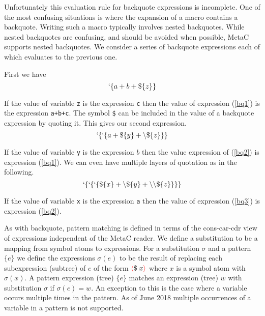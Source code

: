 \documentclass{article}
\newcommand{\fopen}{{\color{red} \langle}}
\newcommand{\fclose}{{\color{red} \rangle}}
\begin{document}
Unfortunately this evaluation rule for backquote expressions is incomplete.  One of the most
confusing situations is where the expansion of a macro contains a backquote.  Writing such a macro typically involves nested backquotes.  While nested backquotes
are confusing, and should be avoided when possible, MetaC supports nested backquotes.  We consider a series of backquote expressions each of which evaluates to the previous one.

First we have
\begin{equation}
\label{bq1}
`\{a+b+\$\{z\}\}
\end{equation}

If the value of variable {\tt z} is the expression {\tt c} then the value of expression (\ref{bq1}) is the expression {\tt a+b+c}.
The symbol {\tt \$} can be included in the value of a backquote expression by quoting it.  This gives our second expression.
\begin{equation}
\label{bq2}
`\{`\{a + \$\{y\} + \backslash\$\{z\}\}\}
\end{equation}

If the value of variable {\tt y} is the expression $b$ then the value expression of (\ref{bq2}) is expression (\ref{bq1}).
We can even have multiple layers of quotation as in the following.
\begin{equation}
\label{bq3}
`\{`\{`\{\$\{x\} + \backslash\$\{y\} + \backslash\backslash\$\{z\}\}\}\}
\end{equation}

If the value of variable {\tt x} is the expression {\tt a} then the value of expression (\ref{bq3}) is expression (\ref{bq2}).

As with backquote, pattern matching is defined in terms of the cons-car-cdr view of expressions independent of the MetaC reader.  We define a substitution to be a mapping from
symbol atoms to expressions. For a substitution $\sigma$ and a pattern $\{e\}$ we define the expressions $\sigma(e)$
to be the result of replacing each subexpression (subtree) of $e$ of the form $\fopen \$\;x \fclose$ where $x$ is a symbol atom with $\sigma(x)$.  A pattern expression (tree) $\{e\}$ matches an expression (tree) $w$ with substitution $\sigma$
if $\sigma(e) = w$. An exception to this is the case where a variable occurs multiple times in the pattern.  As of June 2018 multiple occurrences of a variable in a pattern is not supported.
\end{document}

